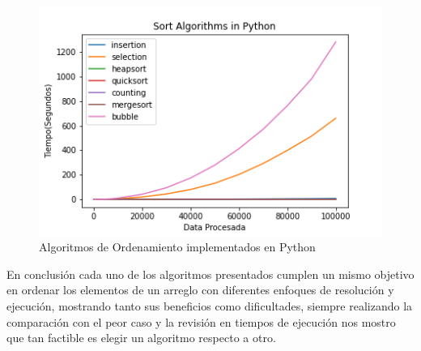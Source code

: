 \documentclass{article}
\begin{document}
                	\begin{figure}[H]
        				\centering
        				\includegraphics[scale=0.60]{img/sort-algorithms-python.png}
        				\caption{Algoritmos de Ordenamiento implementados en Python}
        				\label{fig:sort-algorithms-python}
        			\end{figure}
        			
        			En conclusión cada uno de los algoritmos presentados cumplen un mismo objetivo en ordenar los elementos de un arreglo con diferentes enfoques de resolución y ejecución, mostrando tanto sus beneficios como dificultades, siempre realizando la comparación con el peor caso y la revisión en tiempos de ejecución nos mostro que tan factible es elegir un algoritmo respecto a otro.
        			
    
    \newpage
    
	
    \nocite{*}
    
	
	\newpage
	
	\lstlistoflistings	
	
\end{document}
